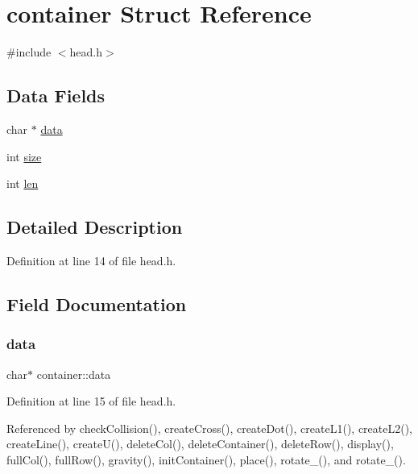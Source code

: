 \hypertarget{structcontainer}{}\section{container Struct Reference}
\label{structcontainer}


{\ttfamily \#include $<$head.\+h$>$}

\subsection*{Data Fields}
\begin{DoxyCompactItemize}
\item 
char $\ast$ \hyperlink{structcontainer_aefae69762fe9c24169e2ca5418a711a1}{data}
\item 
int \hyperlink{structcontainer_a1e938d250074e70b9778df1b59121744}{size}
\item 
int \hyperlink{structcontainer_a0069496fb95c879cd33fb79ab726e81a}{len}
\end{DoxyCompactItemize}


\subsection{Detailed Description}


Definition at line 14 of file head.\+h.



\subsection{Field Documentation}
\mbox{\label{structcontainer_aefae69762fe9c24169e2ca5418a711a1}} 
\subsubsection{\texorpdfstring{data}{data}}
{\footnotesize\ttfamily char$\ast$ container\+::data}



Definition at line 15 of file head.\+h.



Referenced by check\+Collision(), create\+Cross(), create\+Dot(), create\+L1(), create\+L2(), create\+Line(), create\+U(), delete\+Col(), delete\+Container(), delete\+Row(), display(), full\+Col(), full\+Row(), gravity(), init\+Container(), place(), rotate\+\_(), and rotate\+\_().

